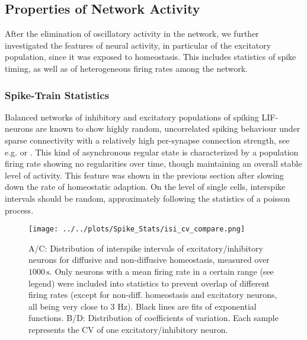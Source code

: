 \documentclass[10pt,a4paper]{article}
\begin{document}
\subsection{Properties of Network Activity}

After the elimination of oscillatory activity in the network, we further investigated the features of neural activity, in particular of the excitatory population, since it was exposed to homeostasis. This includes statistics of spike timing, as well as of heterogeneous firing rates among the network.  

\subsubsection{Spike-Train Statistics}
Balanced networks of inhibitory and excitatory populations of spiking LIF-neurons are known to show highly random, uncorrelated spiking behaviour under sparse connectivity with a relatively high per-synapse connection strength, see e.g. \cite{Vreeswijk1996} or \cite{Brunel2000}. This kind of asynchronous regular state is characterized by a population firing rate showing no regularities over time, though maintaining an overall stable level of activity. This feature was shown in the previous section after slowing down the rate of homeostatic adaption. On the level of single cells, interspike intervals should be random, approximately following the statistics of a poisson process.   
\begin{figure}
\texttt{[image: ../../plots/Spike\_Stats/isi\_cv\_compare.png]}
\caption{A/C: Distribution of interspike intervals of excitatory/inhibitory neurons for diffusive and non-diffusive homeostasis, measured over $\mathrm{1000\,s}$. Only neurons with a mean firing rate in a certain range (see legend) were included into statistics to prevent overlap of different firing rates (except for non-diff. homeostasis and excitatory neurons, all being very close to 3 Hz). Black lines are fits of exponential functions. B/D: Distribution of coefficients of variation. Each sample represents the CV of one excitatory/inhibitory neuron.}
\label{ISI_CV_compare}
\end{figure}
\end{document}
